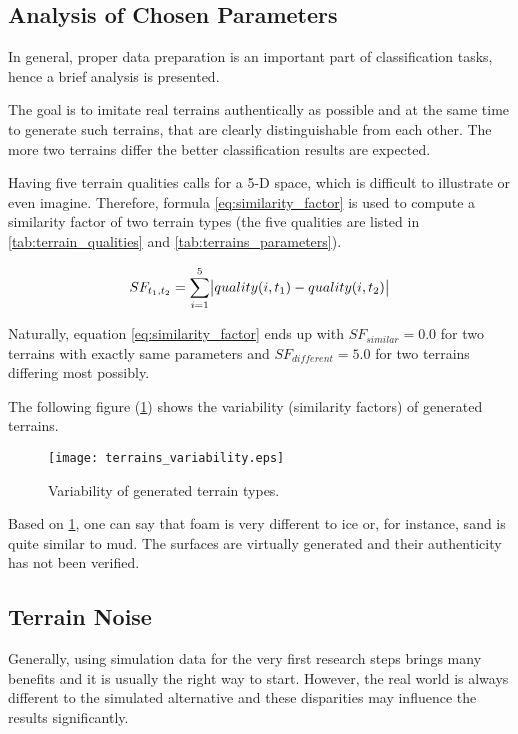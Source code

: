 \subsection{Analysis of Chosen Parameters} \label{ssec:terrains_analysis}
In general, proper data preparation is an important part of classification tasks, hence a brief analysis is presented.

The goal is to imitate real terrains authentically as possible and at the same time to generate such terrains, that are clearly distinguishable from each other. The more two terrains differ the better classification results are expected.

Having five terrain qualities calls for a 5-D space, which is difficult to illustrate or even imagine. Therefore, formula \ref{eq:similarity_factor} is used to compute a similarity factor of two terrain types (the five qualities are listed in \cref{tab:terrain_qualities} and \cref{tab:terrains_parameters}).


\begin{equation} 
\label{eq:similarity_factor}
  SF_{t_1, t_2} = \displaystyle\sum_{i=1}^{5} \abs{quality(i, t_1) - quality(i, t_2)}
\end{equation} 

Naturally, equation \ref{eq:similarity_factor} ends up with $ SF_{similar} = 0.0 $ for two terrains with exactly same parameters and $ SF_{different} = 5.0 $ for two terrains differing most possibly.

The following figure (\ref{fig:terrains_parameters}) shows the variability (similarity factors) of generated terrains.

\begin{figure}[H]
  \centering
  \texttt{[image: terrains\_variability.eps]}
  \caption{Variability of generated terrain types.}
  \label{fig:terrains_parameters}
\end{figure}

Based on \cref{fig:terrains_parameters}, one can say that foam is very different to ice or, for instance, sand is quite similar to mud. The surfaces are virtually generated and their authenticity has not been verified. 

\subsection{Terrain Noise} \label{ssec:terrain_noise}
Generally, using simulation data for the very first research steps brings many benefits and it is usually the right way to start. However, the real world is always different to the simulated alternative and these disparities may influence the results significantly.

